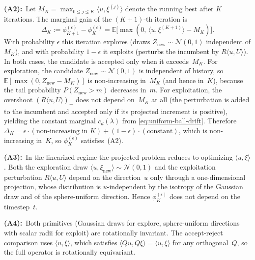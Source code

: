 \begin{example}
\textbf{(A2):}~Let $M_K=\max_{0\le j\le K}\langle u,\xi^{(j)}\rangle$
denote the running best after $K$ iterations.
The marginal gain of the $(K{+}1)$-th iteration is
\[
  \Delta_K
  := \phi_{K+1}^{(\epsilon)}-\phi_K^{(\epsilon)}
  = \mathbb{E}\bigl[\max(0,\,\langle u,\xi^{(K+1)}\rangle - M_K)\bigr].
\]
With probability $\epsilon$ this iteration explores
(draws $Z_{\mathrm{new}}\sim\mathcal{N}(0,1)$ independent of $M_K$),
and with probability $1{-}\epsilon$ it exploits
(perturbs the incumbent by $R\langle u,U\rangle$).
In both cases, the candidate is accepted only when it exceeds~$M_K$.
For exploration, the candidate $Z_{\mathrm{new}}\sim\mathcal{N}(0,1)$
is independent of history, so
$\mathbb{E}[\max(0,Z_{\mathrm{new}}-M_K)]$ is non-increasing
in~$M_K$ (and hence in~$K$), because the tail probability
$P(Z_{\mathrm{new}}>m)$ decreases in~$m$.
For exploitation, the overshoot $(R\langle u,U\rangle)_+$
does not depend on~$M_K$ at all (the perturbation is added to
the incumbent and accepted only if its projected increment is positive),
yielding the constant marginal $c_d(\lambda)$ from
\eqref{eq:uniform-ball-drift}.
Therefore
$\Delta_K = \epsilon\cdot(\text{non-increasing in }K)
+ (1{-}\epsilon)\cdot(\text{constant})$,
which is non-increasing in~$K$,
so $\phi_K^{(\epsilon)}$ satisfies~(A2).

\textbf{(A3):}~In the linearized regime the projected problem
reduces to optimizing $\langle u,\xi\rangle$.
Both the exploration draw $\langle u,\xi_{\mathrm{new}}\rangle
\sim\mathcal{N}(0,1)$ and the exploitation perturbation
$R\langle u,U\rangle$ depend on the direction~$u$ only through a
one-dimensional projection, whose distribution is $u$-independent by
the isotropy of the Gaussian draw and of the sphere-uniform direction.
Hence $\phi_K^{(\epsilon)}$ does not depend on the timestep~$t$.

\textbf{(A4):}~Both primitives (Gaussian draws for explore,
sphere-uniform directions with scalar radii for exploit) are
rotationally invariant.
The accept-reject comparison uses
$\langle u,\xi\rangle$, which satisfies
$\langle Qu,Q\xi\rangle=\langle u,\xi\rangle$ for any
orthogonal~$Q$, so the full operator is rotationally equivariant.
\end{example}

